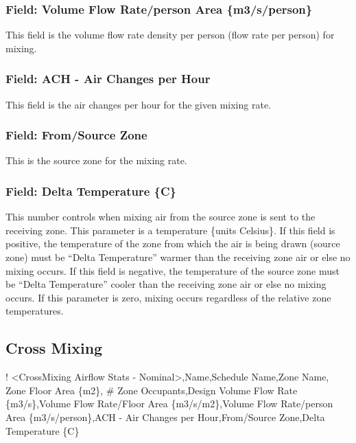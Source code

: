 \subsubsection{Field: Volume Flow Rate/person Area \{m3/s/person\}}\label{field-volume-flow-rateperson-area-m3sperson-1}

This field is the volume flow rate density per person (flow rate per person) for mixing.

\subsubsection{Field: ACH - Air Changes per Hour}\label{field-ach---air-changes-per-hour-2}

This field is the air changes per hour for the given mixing rate.

\subsubsection{Field: From/Source Zone}\label{field-fromsource-zone}

This is the source zone for the mixing rate.

\subsubsection{Field: Delta Temperature \{C\}}\label{field-delta-temperature-c}

This number controls when mixing air from the source zone is sent to the receiving zone. This parameter is a temperature \{units Celsius\}. If this field is positive, the temperature of the zone from which the air is being drawn (source zone) must be ``Delta Temperature'' warmer than the receiving zone air or else no mixing occurs. If this field is negative, the temperature of the source zone must be ``Delta Temperature'' cooler than the receiving zone air or else no mixing occurs. If this parameter is zero, mixing occurs regardless of the relative zone temperatures.

\subsection{Cross Mixing}\label{cross-mixing}

! \textless{}CrossMixing Airflow Stats - Nominal\textgreater{},Name,Schedule Name,Zone Name, Zone Floor Area \{m2\}, \# Zone Occupants,Design Volume Flow Rate \{m3/s\},Volume Flow Rate/Floor Area \{m3/s/m2\},Volume Flow Rate/person Area \{m3/s/person\},ACH - Air Changes per Hour,From/Source Zone,Delta Temperature \{C\}

